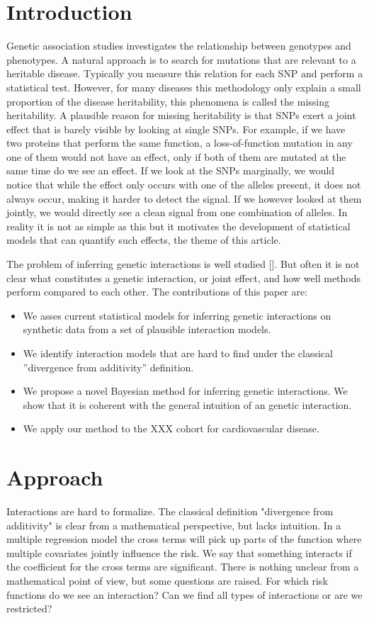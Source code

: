 \documentclass{bioinfo}
\begin{document}
\section{Introduction}
Genetic association studies investigates the relationship between genotypes and phenotypes. A natural approach is to search for mutations that are relevant to a heritable disease. Typically you measure this relation for each SNP and perform a statistical test. However, for many diseases this methodology only explain a small proportion of the disease heritability, this phenomena is called the missing heritability. A plausible reason for missing heritability is that SNPs exert a joint effect that is barely visible by looking at single SNPs. For example, if we have two proteins that perform the same function, a loss-of-function mutation in any one of them would not have an effect, only if both of them are mutated at the same time do we see an effect. If we look at the SNPs marginally, we would notice that while the effect only occurs with one of the alleles present, it does not always occur, making it harder to detect the signal. If we however looked at them jointly, we would directly see a clean signal from one combination of alleles. In reality it is not as simple as this but it motivates the development of statistical models that can quantify such effects, the theme of this article.

The problem of inferring genetic interactions is well studied []. But often it is not clear what constitutes a genetic interaction, or joint effect, and how well methods perform compared to each other. The contributions of this paper are:
\begin{itemize}
\item We asses current statistical models for inferring genetic interactions on synthetic data from a set of plausible interaction models.
\item We identify interaction models that are hard to find under the classical ''divergence from additivity'' definition.
\item We propose a novel Bayesian method for inferring genetic interactions. We show that it is coherent with the general intuition of an genetic interaction.
\item We apply our method to the XXX cohort for cardiovascular disease.
\end{itemize}

\section{Approach}
Interactions are hard to formalize. The classical definition "divergence from additivity" is clear from a mathematical perspective, but lacks intuition. In a multiple regression model the cross terms will pick up parts of the function where multiple covariates jointly influence the risk. We say that something interacts if the coefficient for the cross terms are significant. There is nothing unclear from a mathematical point of view, but some questions are raised. For which risk functions do we see an interaction? Can we find all types of interactions or are we restricted?
\end{document}
